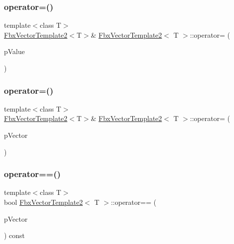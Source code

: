 \mbox{\label{class_fbx_vector_template2_ad30461b620c236ca3914e078aa3a74a9}} 
\subsubsection{\texorpdfstring{operator=()}{operator=()}\hspace{0.1cm}{\footnotesize\ttfamily [1/2]}}
{\footnotesize\ttfamily template$<$class T$>$ \\
\hyperlink{class_fbx_vector_template2}{Fbx\+Vector\+Template2}$<$T$>$\& \hyperlink{class_fbx_vector_template2}{Fbx\+Vector\+Template2}$<$ T $>$\+::operator= (\begin{DoxyParamCaption}\item[{const T \&}]{p\+Value }\end{DoxyParamCaption})}

\mbox{\label{class_fbx_vector_template2_acc052cfaef7530489fdc47ffea2ed78e}} 
\subsubsection{\texorpdfstring{operator=()}{operator=()}\hspace{0.1cm}{\footnotesize\ttfamily [2/2]}}
{\footnotesize\ttfamily template$<$class T$>$ \\
\hyperlink{class_fbx_vector_template2}{Fbx\+Vector\+Template2}$<$T$>$\& \hyperlink{class_fbx_vector_template2}{Fbx\+Vector\+Template2}$<$ T $>$\+::operator= (\begin{DoxyParamCaption}\item[{const \hyperlink{class_fbx_vector_template2}{Fbx\+Vector\+Template2}$<$ T $>$ \&}]{p\+Vector }\end{DoxyParamCaption})}

\mbox{\label{class_fbx_vector_template2_ad9921dfc627c8fba190e708555d21c84}} 
\subsubsection{\texorpdfstring{operator==()}{operator==()}}
{\footnotesize\ttfamily template$<$class T$>$ \\
bool \hyperlink{class_fbx_vector_template2}{Fbx\+Vector\+Template2}$<$ T $>$\+::operator== (\begin{DoxyParamCaption}\item[{const \hyperlink{class_fbx_vector_template2}{Fbx\+Vector\+Template2}$<$ T $>$ \&}]{p\+Vector }\end{DoxyParamCaption}) const}

